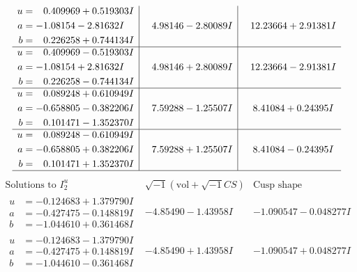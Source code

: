 \documentclass[1p]{elsarticle_modified}
\theoremstyle{definition}
\newcommand{\I}{\sqrt{-1}}
\begin{document}
$$\begin{array}{c|c|c}
\begin{aligned}
u &= \phantom{-}0.409969 + 0.519303 I \\
a &= -1.08154 - 2.81632 I \\
b &= \phantom{-}0.226258 + 0.744134 I\end{aligned}
 & \phantom{-}4.98146 - 2.80089 I & \phantom{-}12.23664 + 2.91381 I \\ \hline\begin{aligned}
u &= \phantom{-}0.409969 - 0.519303 I \\
a &= -1.08154 + 2.81632 I \\
b &= \phantom{-}0.226258 - 0.744134 I\end{aligned}
 & \phantom{-}4.98146 + 2.80089 I & \phantom{-}12.23664 - 2.91381 I \\ \hline\begin{aligned}
u &= \phantom{-}0.089248 + 0.610949 I \\
a &= -0.658805 - 0.382206 I \\
b &= \phantom{-}0.101471 - 1.352370 I\end{aligned}
 & \phantom{-}7.59288 - 1.25507 I & \phantom{-}8.41084 + 0.24395 I \\ \hline\begin{aligned}
u &= \phantom{-}0.089248 - 0.610949 I \\
a &= -0.658805 + 0.382206 I \\
b &= \phantom{-}0.101471 + 1.352370 I\end{aligned}
 & \phantom{-}7.59288 + 1.25507 I & \phantom{-}8.41084 - 0.24395 I\\
 \hline 
 \end{array}$$\newpage$$\begin{array}{c|c|c}  
\text{Solutions to }I^u_{2}& \I (\text{vol} + \sqrt{-1}CS) & \text{Cusp shape}\\
 \hline 
\begin{aligned}
u &= -0.124683 + 1.379790 I \\
a &= -0.427475 - 0.148819 I \\
b &= -1.044610 + 0.361468 I\end{aligned}
 & -4.85490 - 1.43958 I & -1.090547 - 0.048277 I \\ \hline\begin{aligned}
u &= -0.124683 - 1.379790 I \\
a &= -0.427475 + 0.148819 I \\
b &= -1.044610 - 0.361468 I\end{aligned}
 & -4.85490 + 1.43958 I & -1.090547 + 0.048277 I \\ \hline\begin{aligned}

\end{aligned}
\end{array}$$
\end{document}

